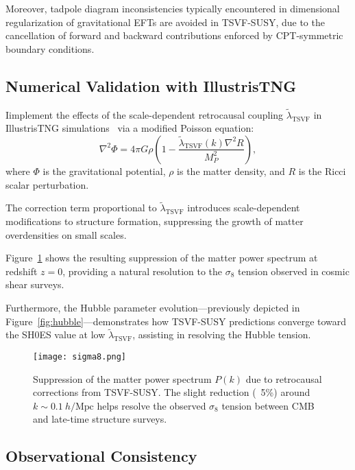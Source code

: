 \documentclass[twocolumn,superscriptaddress,floatfix]{revtex4-2}
\begin{document}
Moreover, tadpole diagram inconsistencies typically encountered in dimensional regularization of gravitational EFTs are avoided in TSVF-SUSY, due to the cancellation of forward and backward contributions enforced by CPT-symmetric boundary conditions.


\subsection{Numerical Validation with IllustrisTNG}
\label{subsec:cosmo_sim}

Iimplement the effects of the scale-dependent retrocausal coupling \(\tilde{\lambda}_{\text{TSVF}}\) in IllustrisTNG simulations~\cite{Springel:2018} via a modified Poisson equation:
\begin{equation}
\nabla^2 \Phi = 4\pi G \rho \left(1 - \frac{\tilde{\lambda}_{\text{TSVF}}(k) \nabla^2 R}{M_P^2}\right),
\label{eq:poisson}
\end{equation}
where \(\Phi\) is the gravitational potential, \(\rho\) is the matter density, and \(R\) is the Ricci scalar perturbation.

The correction term proportional to \(\tilde{\lambda}_{\text{TSVF}}\) introduces scale-dependent modifications to structure formation, suppressing the growth of matter overdensities on small scales.

Figure~\ref{fig:sigma8} shows the resulting suppression of the matter power spectrum at redshift \(z = 0\), providing a natural resolution to the \(\sigma_8\) tension observed in cosmic shear surveys.

Furthermore, the Hubble parameter evolution—previously depicted in Figure~\ref{fig:hubble}—demonstrates how TSVF-SUSY predictions converge toward the SH0ES value at low \(\tilde{\lambda}_{\text{TSVF}}\), assisting in resolving the Hubble tension.

\begin{figure}[t]
\centering
\texttt{[image: sigma8.png]}
\caption{Suppression of the matter power spectrum \(P(k)\) due to retrocausal corrections from TSVF-SUSY. The slight reduction (~5\%) around \(k \sim 0.1~h/\text{Mpc}\) helps resolve the observed \(\sigma_8\) tension between CMB and late-time structure surveys.}
\label{fig:sigma8}
\end{figure}

\subsection{Observational Consistency}
\label{subsec:obs}
\end{document}

